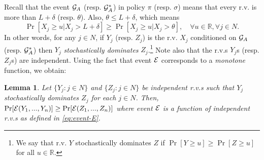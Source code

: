 \documentclass[11pt]{article}
\newtheorem{lem}[thm]{Lemma}
\theoremstyle{remark}
\theoremstyle{plain}
\theoremstyle{remark}
\begin{document}
Recall that the event ${\cal G}_A$ (resp. ${\cal G}^*_A$) in policy $\pi$ (resp. $\sigma$) means that every  r.v. is more than $L+\delta$ (resp. $\theta$). Also, $\theta \le L+\delta$, which means 
$$\Pr[X_j \ge u| X_j >L+\delta] \ge \Pr[X_j\ge u | X_j >\theta], \quad \forall u\in \mathbb{R} , \forall j\in N. $$
In other words, for any $j\in N$, if  $Y_j$ (resp. $Z_j$) is the  r.v. $X_j$ conditioned on ${\cal G}_A$ (resp. ${\cal G}^*_A$)
then $Y_j$ {\em stochastically dominates} $Z_j$.\footnote{We say that r.v. $Y$ stochastically dominates $Z$ if $\Pr[Y\ge u]\ge \Pr[Z\ge u]$ for all $u\in \mathbb{R}$.} Note also that the r.v.s $Y_j$s (resp. $Z_j$s) are independent. Using the fact that event ${\cal E}$ corresponds to a {\em monotone} function, we obtain:
\begin{lem} \label{lem:event-sd}
Let $\{Y_j:j\in N\}$ and  $\{Z_j:j\in N\}$ be independent r.v.s such that $Y_j$  stochastically dominates $Z_j$ for each $j\in N$. Then, $\Pr[ {\cal E}(Y_1,...,Y_n ) ] \ge  \Pr[{\cal E}(Z_1,...,Z_n)]$ where event ${\cal E}$ is a function of independent r.v.s as defined in \eqref{eq:event-E}.  
\end{lem}
\end{document}
